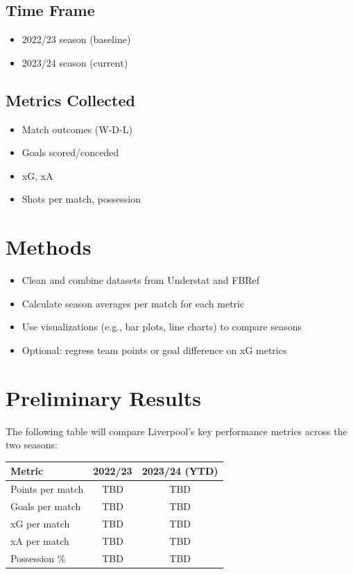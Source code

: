 \documentclass[12pt]{article}
\begin{document}
\subsection*{Time Frame}
\begin{itemize}
    \item 2022/23 season (baseline)
    \item 2023/24 season (current)
\end{itemize}

\subsection*{Metrics Collected}
\begin{itemize}
    \item Match outcomes (W-D-L)
    \item Goals scored/conceded
    \item xG, xA
    \item Shots per match, possession %
\end{itemize}

\section{Methods}
\begin{itemize}
    \item Clean and combine datasets from Understat and FBRef
    \item Calculate season averages per match for each metric
    \item Use visualizations (e.g., bar plots, line charts) to compare seasons
    \item Optional: regress team points or goal difference on xG metrics
\end{itemize}

\section{Preliminary Results}
The following table will compare Liverpool's key performance metrics across the two seasons:

\begin{center}
\begin{tabular}{lcc}
\textbf{Metric} & \textbf{2022/23} & \textbf{2023/24 (YTD)} \\
\hline
Points per match & TBD & TBD \\
Goals per match & TBD & TBD \\
xG per match & TBD & TBD \\
xA per match & TBD & TBD \\
Possession \% & TBD & TBD \\
\end{tabular}
\end{center}
\end{document}
